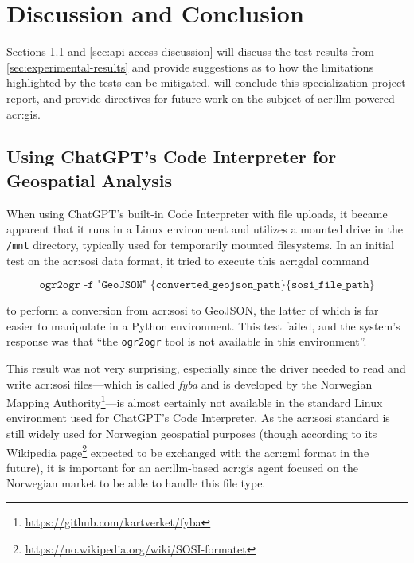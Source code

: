 \chapter{Discussion and Conclusion}\label{cha:discussion-and-conclusion}

Sections \ref{sec:code-interpreter-discussion} and \ref{sec:api-access-discussion} will discuss the test results from \autoref{sec:experimental-results} and provide suggestions as to how the limitations highlighted by the tests can be mitigated.  will conclude this specialization project report, and provide directives for future work on the subject of \acrshort{acr:llm}-powered \acrshort{acr:gis}.

\section{Using ChatGPT's Code Interpreter for Geospatial Analysis}\label{sec:code-interpreter-discussion}

When using ChatGPT's built-in Code Interpreter with file uploads, it became apparent that it runs in a Linux environment and utilizes a mounted drive in the \texttt{/mnt} directory, typically used for temporarily mounted filesystems. In an initial test on the \acrshort{acr:sosi} data format, it tried to execute this \acrshort{acr:gdal} command

$$
    \texttt{ogr2ogr -f "GeoJSON" \{converted\_geojson\_path\} \{sosi\_file\_path\}}
$$

\noindent to perform a conversion from \acrshort{acr:sosi} to GeoJSON, the latter of which is far easier to manipulate in a Python environment. This test failed, and the system's response was that \enquote{the \texttt{ogr2ogr} tool is not available in this environment}.

This result was not very surprising, especially since the driver needed to read and write \acrshort{acr:sosi} files---which is called \textit{fyba} and is developed by the Norwegian Mapping Authority\footnote{\url{https://github.com/kartverket/fyba}}---is almost certainly not available in the standard Linux environment used for ChatGPT's Code Interpreter. As the \acrshort{acr:sosi} standard is still widely used for Norwegian geospatial purposes (though according to its Wikipedia page\footnote{\url{https://no.wikipedia.org/wiki/SOSI-formatet}} expected to be exchanged with the \acrshort{acr:gml} format in the future), it is important for an \acrshort{acr:llm}-based \acrshort{acr:gis} agent focused on the Norwegian market to be able to handle this file type.

